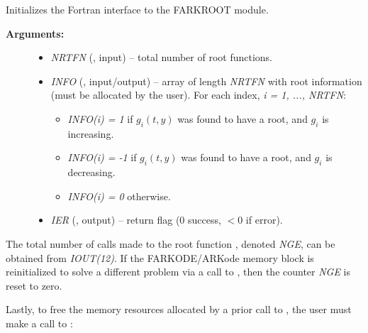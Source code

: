 \documentclass[letterpaper,10pt,english]{sphinxmanual}
\begin{document}
\begin{fulllineitems}
\label{f_interface/Rootfinding:f/_/FARKROOTINFO}
Initializes the Fortran interface to the FARKROOT module.
\begin{description}
\item[{\textbf{Arguments:}}] \leavevmode\begin{itemize}
\item {} 
\emph{NRTFN} (, input) -- total number of root functions.

\item {} 
\emph{INFO} (, input/output) -- array of length \emph{NRTFN} with
root information (must be allocated by the user).  For each
index, \emph{i = 1, ..., NRTFN}:
\begin{itemize}
\item {} 
\emph{INFO(i) = 1}  if $g_i(t,y)$ was found to have a root,
and $g_i$ is increasing.

\item {} 
\emph{INFO(i) = -1}  if $g_i(t,y)$ was found to have a root,
and $g_i$ is decreasing.

\item {} 
\emph{INFO(i) = 0}  otherwise.

\end{itemize}

\item {} 
\emph{IER} (, output) -- return flag (0 success, $<0$
if error).

\end{itemize}

\end{description}

\end{fulllineitems}


The total number of calls made to the root function
{\hyperref[f_interface/Rootfinding:f/_/FARKROOTFN]{}}, denoted \emph{NGE}, can be obtained from
\emph{IOUT(12)}.  If the FARKODE/ARKode memory block is reinitialized to
solve a different problem via a call to {\hyperref[f_interface/Usage:f/_/FARKREINIT]{}}, then
the counter \emph{NGE} is reset to zero.

Lastly, to free the memory resources allocated by a prior call to
{\hyperref[f_interface/Rootfinding:f/_/FARKROOTINIT]{}}, the user must make a call to
{\hyperref[f_interface/Rootfinding:f/_/FARKROOTFREE]{}}:
\end{document}
